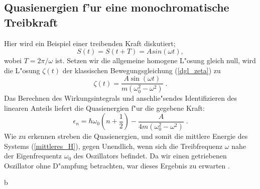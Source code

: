     \subsection{Quasienergien f'ur eine monochromatische Treibkraft}
      Hier wird ein Beispiel einer treibenden Kraft diskutiert;
      \begin{equation}
        S(t) = S(t+T) = Asin(\omega t),
      \end{equation}
      wobei $T=2\pi / \omega$ ist.
      Setzen wir die allgemeine homogene L"osung gleich null, wird die L"osung $\zeta(t)$ der klassischen Bewegungsgleichung (\ref{dgl_zeta}) zu \cite{mads}
      \begin{equation}
        \zeta(t) = \frac{A\sin(\omega t)}{m(\omega_0^2 - \omega^2)} \; .
      \end{equation}
      Das Berechnen des Wirkungsintegrals und anschlie"sendes Identifizieren des linearen Anteils liefert die Quasienergien f"ur die gegebene Kraft:
      \begin{equation}
        \epsilon_n  = \hbar \omega_0(n+\frac{1}{2}) - \frac{A}{4m(\omega_0^2-\omega^2)} \;.
      \end{equation}
      Wie zu erkennen streben die Quasienergien, und somit die mittlere Energie des Systems (\ref{mittleres_H}), gegen Unendlich, wenn sich die Treibfrequenz $\omega$ nahe der Eigenfrequentz $\omega_0 $ des Oszillators befindet.
      Da wir einen getriebenen Oszillator ohne D"ampfung betrachten, war dieses Ergebnis zu erwarten \cite{mads}.



























  b
